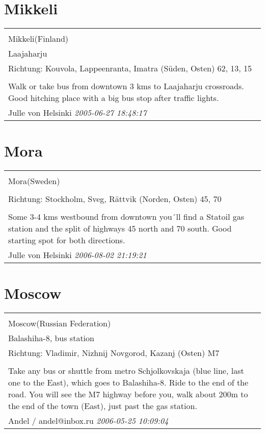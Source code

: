 \documentclass[a4paper,12pt]{article}
\begin{document}
\section{Mikkeli}
\begin{tabular}{|p{13cm}|}
\hline\\
Mikkeli(Finland)\\
Laajaharju\\
Richtung: Kouvola, Lappeenranta, Imatra (Süden, Osten) 62, 13, 15 \\
\hline\\
Walk or take bus from downtown 3 kms to Laajaharju crossroads. Good hitching place with a big bus stop after traffic lights. \\
Julle von Helsinki \textit{ 2005-06-27 18:48:17 }\\\hline
\end{tabular}


\section{Mora}
\begin{tabular}{|p{13cm}|}
\hline\\
Mora(Sweden)\\
\\
Richtung: Stockholm, Sveg, Rättvik (Norden, Osten) 45, 70 \\
\hline\\
Some 3-4 kms westbound from downtown you´ll find a Statoil gas station and the split of highways 45 north and 70 south. Good starting spot for both directions. \\
Julle von Helsinki \textit{ 2006-08-02 21:19:21 }\\\hline
\end{tabular}


\section{Moscow}
\begin{tabular}{|p{13cm}|}
\hline\\
Moscow(Russian Federation)\\
Balashiha-8, bus station\\
Richtung: Vladimir, Nizhnij Novgorod, Kazanj (Osten) M7 \\
\hline\\
Take any bus or shuttle from metro Schjolkovskaja (blue line, last one to the East), which goes to Balashiha-8. Ride to the end of the road. You will see the M7 highway before you, walk about 200m to the end of the town (East), just past the gas station. \\
Andel / andel@inbox.ru \textit{ 2006-05-25 10:09:04 }\\\hline
\end{tabular}
\end{document}
